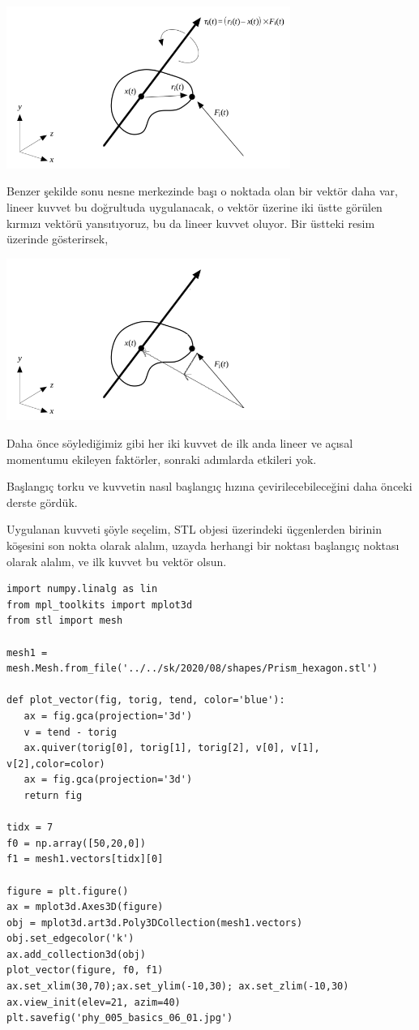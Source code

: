 \documentclass[12pt,fleqn]{article}\usepackage{../../common}
\begin{document}
\includegraphics[width=25em]{phy_008_sim_rigbod_01.png}

Benzer şekilde sonu nesne merkezinde başı o noktada olan bir vektör daha var,
lineer kuvvet bu doğrultuda uygulanacak, o vektör üzerine iki üstte görülen
kırmızı vektörü yansıtıyoruz, bu da lineer kuvvet oluyor. Bir üstteki resim
üzerinde gösterirsek,

\includegraphics[width=25em]{phy_008_sim_rigbod_02.png}

Daha önce söylediğimiz gibi her iki kuvvet de ilk anda lineer ve açısal
momentumu ekileyen faktörler, sonraki adımlarda etkileri yok.

Başlangıç torku ve kuvvetin nasıl başlangıç hızına çevirilecebileceğini daha
önceki derste gördük.

Uygulanan kuvveti şöyle seçelim, STL objesi üzerindeki üçgenlerden birinin
köşesini son nokta olarak alalım, uzayda herhangi bir noktası başlangıç
noktası olarak alalım, ve ilk kuvvet bu vektör olsun.

\begin{verbatim}
import numpy.linalg as lin
from mpl_toolkits import mplot3d
from stl import mesh

mesh1 = mesh.Mesh.from_file('../../sk/2020/08/shapes/Prism_hexagon.stl')

def plot_vector(fig, torig, tend, color='blue'):
   ax = fig.gca(projection='3d')
   v = tend - torig
   ax.quiver(torig[0], torig[1], torig[2], v[0], v[1], v[2],color=color)
   ax = fig.gca(projection='3d')  
   return fig

tidx = 7
f0 = np.array([50,20,0])
f1 = mesh1.vectors[tidx][0]
   
figure = plt.figure()
ax = mplot3d.Axes3D(figure)
obj = mplot3d.art3d.Poly3DCollection(mesh1.vectors)
obj.set_edgecolor('k')
ax.add_collection3d(obj)
plot_vector(figure, f0, f1)
ax.set_xlim(30,70);ax.set_ylim(-10,30); ax.set_zlim(-10,30)
ax.view_init(elev=21, azim=40)
plt.savefig('phy_005_basics_06_01.jpg')
\end{verbatim}
\end{document}
